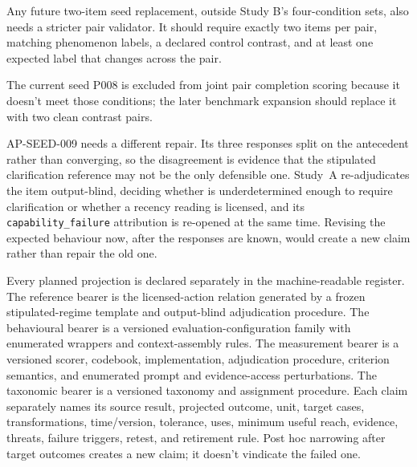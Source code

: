 Any future two-item seed replacement, outside Study B's four-condition sets, also needs a stricter pair validator. It should require exactly two items per pair, matching phenomenon labels, a declared control contrast, and at least one expected label that changes across the pair.

The current seed P008 is excluded from joint pair completion scoring because it
doesn't meet those conditions; the later benchmark expansion should replace it with two
clean contrast pairs.

AP-SEED-009 needs a different repair. Its three responses split on the antecedent rather than converging, so the disagreement is evidence that the stipulated clarification reference may not be the only defensible one. Study~A re-adjudicates the item output-blind, deciding whether  is underdetermined enough to require clarification or whether a recency reading is licensed, and its \texttt{capability\_failure} attribution is re-opened at the same time. Revising the expected behaviour now, after the responses are known, would create a new claim rather than repair the old one.

Every planned projection is declared separately in the machine-readable register. The reference bearer is the licensed-action relation generated by a frozen stipulated-regime template and output-blind adjudication procedure. The behavioural bearer is a versioned evaluation-configuration family with enumerated wrappers and context-assembly rules. The measurement bearer is a versioned scorer, codebook, implementation, adjudication procedure, criterion semantics, and enumerated prompt and evidence-access perturbations. The taxonomic bearer is a versioned taxonomy and assignment procedure. Each claim separately names its source result, projected outcome, unit, target cases, transformations, time/version, tolerance, uses, minimum useful reach, evidence, threats, failure triggers, retest, and retirement rule. Post hoc narrowing after target outcomes creates a new claim; it doesn't vindicate the failed one.

